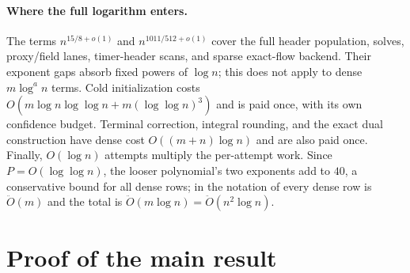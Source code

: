 \documentclass[11pt]{article}
\theoremstyle{remark}
\renewcommand{\O}{\ddot{O}}
\begin{document}
\paragraph{Where the full logarithm enters.}
The terms $n^{15/8+o(1)}$ and $n^{1011/512+o(1)}$ cover the full
header population, solves, proxy/field lanes, timer-header scans, and sparse
exact-flow backend.
Their exponent gaps absorb fixed powers of $\log n$; this does not apply to dense
$m\log^a n$ terms.
Cold initialization costs $O(m\log n\log\log n+m(\log\log n)^3)$ and is paid once, with its own
confidence budget.
Terminal correction, integral rounding, and the exact dual construction have
dense cost $O((m+n)\log n)$ and are also paid once.
Finally, $O(\log n)$ attempts multiply the per-attempt work.
Since $P=O(\log\log n)$, the looser polynomial's two exponents add to $40$, a
conservative bound for all dense rows; in the notation of 
every dense row is $\O(m)$ and the total is $\O(m\log n)=\O(n^2\log n)$.

\section{Proof of the main result}
\label{sec:ram27-main-theorem}
\end{document}
